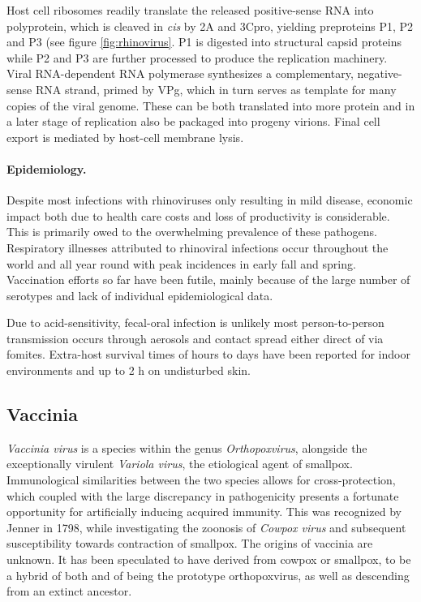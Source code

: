 Host cell ribosomes readily translate the released positive-sense RNA into polyprotein, which is cleaved in \textit{cis} by 2A and 3Cpro, yielding preproteins P1, P2 and P3 (see figure \ref{fig:rhinovirus}. P1 is digested into structural capsid proteins while P2 and P3 are further processed to produce the replication machinery. Viral RNA-dependent RNA polymerase synthesizes a complementary, negative-sense RNA strand, primed by VPg, which in turn serves as template for many copies of the viral genome. These can be both translated into more protein and in a later stage of replication also be packaged into progeny virions. Final cell export is mediated by host-cell membrane lysis.

\paragraph{Epidemiology.}
Despite most infections with rhinoviruses only resulting in mild disease, economic impact both due to health care costs and loss of productivity is considerable. This is primarily owed to the overwhelming prevalence of these pathogens. Respiratory illnesses attributed to rhinoviral infections occur throughout the world and all year round with peak incidences in early fall and spring. Vaccination efforts so far have been futile, mainly because of the large number of serotypes and lack of individual epidemiological data.

Due to acid-sensitivity, fecal-oral infection is unlikely most person-to-person transmission occurs through aerosols and contact spread either direct of via fomites. Extra-host survival times of hours to days have been reported for indoor environments and up to 2 h on undisturbed skin.

\subsection{Vaccinia}
\textit{Vaccinia virus} is a species within the genus \textit{Orthopoxvirus}, alongside the exceptionally virulent \textit{Variola virus}, the etiological agent of smallpox. Immunological similarities between the two species allows for cross-protection, which coupled with the large discrepancy in pathogenicity presents a fortunate opportunity for artificially inducing acquired immunity. This was recognized by Jenner in 1798, while investigating the zoonosis of \textit{Cowpox virus} and subsequent susceptibility towards contraction of smallpox. The origins of vaccinia are unknown. It has been speculated to have derived from cowpox or smallpox, to be a hybrid of both and of being the prototype orthopoxvirus, as well as descending from an extinct ancestor.

